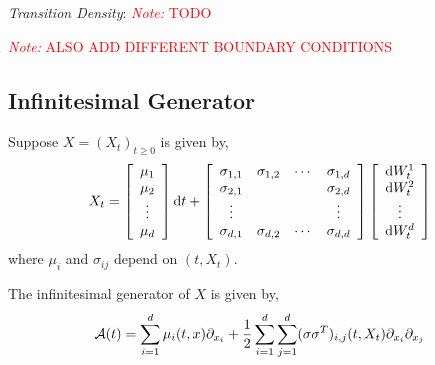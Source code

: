 \documentclass[12pt]{article}
\newcommand{\note}[1]{\textcolor{red}{\textit{Note:} #1}}
\begin{document}
\textit{Transition Density}:
\note{TODO}


\note{ALSO ADD DIFFERENT BOUNDARY CONDITIONS}

\subsection{Infinitesimal Generator}
\label{sec:infgen}
Suppose \( X = (X_t)_{t\geq 0} \) is given by,
\begin{align*}
    X_t = \left[\begin{array}{c}\mu_1 \\ \mu_2 \\ \vdots \\ \mu_d \end{array}\right] \mathrm{d} t + \left[\begin{array}{cccc}\sigma_{1,1} & \sigma_{1,2} & \cdots & \sigma_{1,d} \\
        \sigma_{2,1} & & & \sigma_{2,d} \\
        \vdots & & & \vdots \\
        \sigma_{d,1} & \sigma_{d,2} & \cdots & \sigma_{d,d}
\end{array}\right]
\left[\begin{array}{c}\mathrm{d} W_t^1 \\ \mathrm{d} W_t^2 \\ \vdots \\ \mathrm{d} W_t^d\end{array}\right]
\end{align*}
where \( \mu_i \) and \( \sigma_{ij} \) depend on \( (t,X_t) \).

The infinitesimal generator of \( X \) is given by,
\begin{align*}
    \mathcal{A}(t) = \sum_{i=1}^{d}\mu_i(t,x)\partial_{x_i} + \frac{1}{2} \sum_{i=1}^{d}\sum_{j=1}^{d} (\sigma\sigma^T)_{i,j}(t,X_t)\partial_{x_i} \partial_{x_j}
\end{align*}

\iffalse
In the 2d case,
\begin{align*}
    \sigma \sigma^T = \left[\begin{array}{cc} 
        \sigma_{1,1}^2+\sigma_{1,2}^2 & \sigma_{1,1}\sigma_{2,1} + \sigma_{1,2}\sigma_{2,2} \\
        \sigma_{1,1}\sigma_{2,1}+\sigma_{1,2}\sigma_{2,2} & \sigma_{2,1}^2 + \sigma_{2,2}^2
    \end{array}\right]
\end{align*}
\fi
\end{document}
